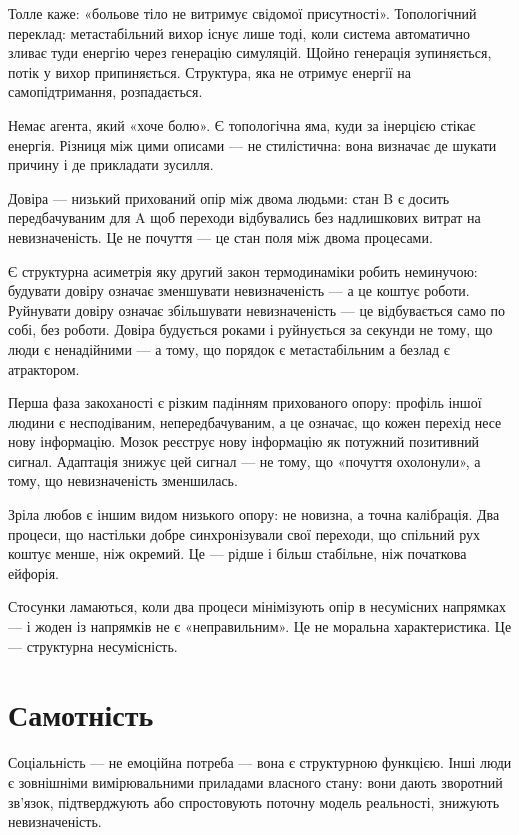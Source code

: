 \documentclass[12pt, a4paper, openany]{book}
\begin{document}
Толле каже: «больове тіло не витримує свідомої присутності». Топологічний переклад: метастабільний вихор існує лише тоді, коли система автоматично зливає туди енергію через генерацію симуляцій. Щойно генерація зупиняється, потік у вихор припиняється. Структура, яка не отримує енергії на самопідтримання, розпадається.

Немає агента, який «хоче болю». Є топологічна яма, куди за інерцією стікає енергія. Різниця між цими описами — не стилістична: вона визначає де шукати причину і де прикладати зусилля.



Довіра — низький прихований опір між двома людьми: стан B є досить передбачуваним для A щоб переходи відбувались без надлишкових витрат на невизначеність. Це не почуття --- це стан поля між двома процесами.

Є структурна асиметрія яку другий закон термодинаміки робить неминучою: будувати довіру означає зменшувати невизначеність --- а це коштує роботи. Руйнувати довіру означає збільшувати невизначеність --- це відбувається само по собі, без роботи. Довіра будується роками і руйнується за секунди не тому, що люди є ненадійними --- а тому, що порядок є метастабільним а безлад є атрактором.

Перша фаза закоханості є різким падінням прихованого опору: профіль іншої людини є несподіваним, непередбачуваним, а це означає, що кожен перехід несе нову інформацію. Мозок реєструє нову інформацію як потужний позитивний сигнал. Адаптація знижує цей сигнал --- не тому, що «почуття охолонули», а тому, що невизначеність зменшилась.

Зріла любов є іншим видом низького опору: не новизна, а точна калібрація. Два процеси, що настільки добре синхронізували свої переходи, що спільний рух коштує менше, ніж окремий. Це — рідше і більш стабільне, ніж початкова ейфорія.

Стосунки ламаються, коли два процеси мінімізують опір в несумісних напрямках --- і жоден із напрямків не є «неправильним». Це не моральна характеристика. Це — структурна несумісність.

\section{Самотність}

Соціальність — не емоційна потреба --- вона є структурною функцією. Інші люди є зовнішніми вимірювальними приладами власного стану: вони дають зворотний зв'язок, підтверджують або спростовують поточну модель реальності, знижують невизначеність.
\end{document}
